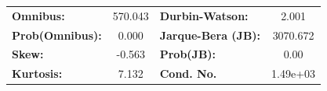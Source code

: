 \documentclass[]{article}
\begin{document}
\begin{center}
\begin{tabular}{lcccccc}
		\bottomrule
	\end{tabular}
	\begin{tabular}{lclc}
		\textbf{Omnibus:}       & 570.043 & \textbf{  Durbin-Watson:     } &    2.001  \\
		\textbf{Prob(Omnibus):} &   0.000 & \textbf{  Jarque-Bera (JB):  } & 3070.672  \\
		\textbf{Skew:}          &  -0.563 & \textbf{  Prob(JB):          } &     0.00  \\
		\textbf{Kurtosis:}      &   7.132 & \textbf{  Cond. No.          } & 1.49e+03  \\
		\bottomrule
	\end{tabular}
\end{center}
\end{document}
